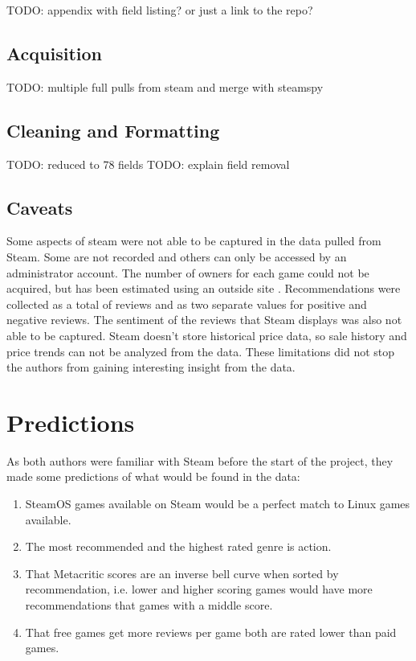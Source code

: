 \documentclass[letterpaper,10pt,twocolumn]{article}
\begin{document}
TODO: appendix with field listing? or just a link to the repo?

\subsection{Acquisition}

TODO: multiple full pulls from steam and merge with steamspy

\subsection{Cleaning and Formatting}

TODO: reduced to 78 fields
TODO: explain field removal

\subsection{Caveats}

Some aspects of steam were not able to be captured in the data pulled from
Steam.  Some are not recorded and others can only be accessed by an
administrator account.  The number of owners for each game could not be
acquired, but has been estimated using an outside site \cite{steamspy}.
Recommendations were collected as a total of reviews and as two separate
values for positive and negative reviews.  The sentiment of the reviews that
Steam displays was also not able to be captured.  Steam doesn't store
historical price data, so sale history and price trends can not be analyzed
from the data.  These limitations did not stop the authors from gaining
interesting insight from the data.



\section{Predictions}

As both authors were familiar with Steam before the start of the project, they
made some predictions of what would be found in the data:

\begin{enumerate}
    \item SteamOS games available on Steam would be a perfect match to Linux
    games available.

    \item The most recommended and the highest rated genre is action.

    \item That Metacritic scores are an inverse bell curve when sorted by
    recommendation, i.e. lower and higher scoring games would have more
    recommendations that games with a middle score.

    \item That free games get more reviews per game both are rated lower than
    paid games.
\end{enumerate}
\end{document}
